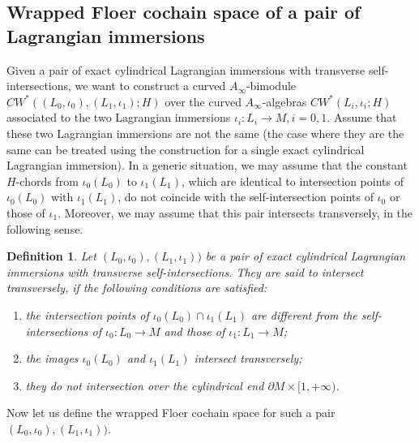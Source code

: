 \documentclass{amsart}
\newtheorem{definition}[theorem]{Definition}
\numberwithin{equation}{section}
\numberwithin{figure}{section}
\begin{document}
\subsection{Wrapped Floer cochain space of a pair of Lagrangian immersions}
	Given a pair of exact cylindrical Lagrangian immersions with transverse self-intersections, we want to construct a curved $A_{\infty}$-bimodule $CW^{*}((L_{0}, \iota_{0}), (L_{1}, \iota_{1}); H)$ over the curved $A_{\infty}$-algebras $CW^{*}(L_{i}, \iota_{i}; H)$ associated to the two Lagrangian immersions $\iota_{i}: L_{i} \to M, i = 0, 1$. Assume that these two Lagrangian immersions are not the same (the case where they are the same can be treated using the construction for a single exact cylindrical Lagrangian immersion). In a generic situation, we may assume that the constant $H$-chords from $\iota_{0}(L_{0})$ to $\iota_{1}(L_{1})$, which are identical to intersection points of $\iota_{0}(L_{0})$ with $\iota_{1}(L_{1})$, do not coincide with the self-intersection points of $\iota_{0}$ or those of $\iota_{1}$. Moreover, we may assume that this pair intersects transversely, in the following sense. \par

\begin{definition}
	Let $(L_{0}, \iota_{0}), (L_{1},  \iota_{1}))$ be a pair of exact cylindrical Lagrangian immersions with transverse self-intersections. They are said to intersect transversely, if the following conditions are satisfied:
\begin{enumerate}[label=(\roman*)]

\item the intersection points of $\iota_{0}(L_{0}) \cap \iota_{1}(L_{1})$ are different from the self-intersections of $\iota_{0}: L_{0} \to M$ and those of $\iota_{1}: L_{1} \to M$;

\item the images $\iota_{0}(L_{0})$ and $\iota_{1}(L_{1})$ intersect transversely;

\item they do not intersection over the cylindrical end $\partial M \times [1, +\infty)$.

\end{enumerate}
\end{definition}

	Now let us define the wrapped Floer cochain space for such a pair $(L_{0}, \iota_{0}), (L_{1},  \iota_{1}))$. \par
	
\end{document}
